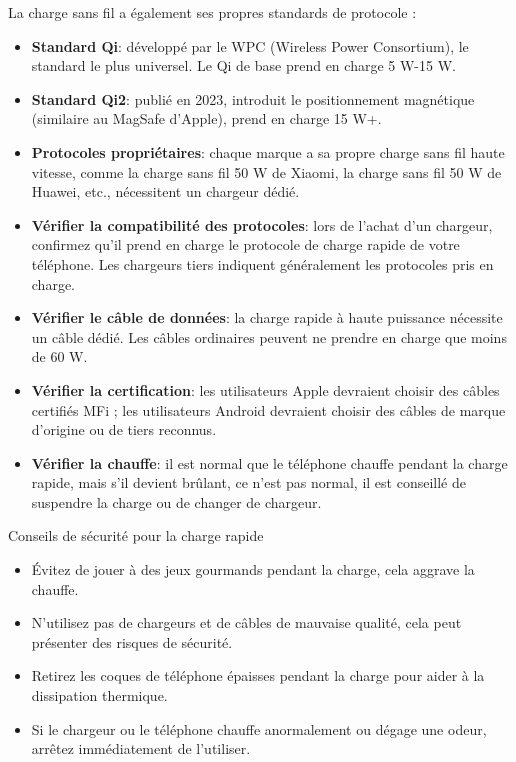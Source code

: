 
La charge sans fil a également ses propres standards de protocole :

\begin{itemize}
  \item \textbf{Standard Qi}: développé par le WPC (Wireless Power Consortium), le standard le plus universel. Le Qi de base prend en charge 5 W-15 W.
  \item \textbf{Standard Qi2}: publié en 2023, introduit le positionnement magnétique (similaire au MagSafe d'Apple), prend en charge 15 W+.
  \item \textbf{Protocoles propriétaires}: chaque marque a sa propre charge sans fil haute vitesse, comme la charge sans fil 50 W de Xiaomi, la charge sans fil 50 W de Huawei, etc., nécessitent un chargeur dédié.
\end{itemize}


\begin{itemize}
  \item \textbf{Vérifier la compatibilité des protocoles}: lors de l'achat d'un chargeur, confirmez qu'il prend en charge le protocole de charge rapide de votre téléphone. Les chargeurs tiers indiquent généralement les protocoles pris en charge.
  \item \textbf{Vérifier le câble de données}: la charge rapide à haute puissance nécessite un câble dédié. Les câbles ordinaires peuvent ne prendre en charge que moins de 60 W.
  \item \textbf{Vérifier la certification}: les utilisateurs Apple devraient choisir des câbles certifiés MFi ; les utilisateurs Android devraient choisir des câbles de marque d'origine ou de tiers reconnus.
  \item \textbf{Vérifier la chauffe}: il est normal que le téléphone chauffe pendant la charge rapide, mais s'il devient brûlant, ce n'est pas normal, il est conseillé de suspendre la charge ou de changer de chargeur.
\end{itemize}

\begin{tcbwarn}{Conseils de sécurité pour la charge rapide}
\begin{itemize}
  \item Évitez de jouer à des jeux gourmands pendant la charge, cela aggrave la chauffe.
  \item N'utilisez pas de chargeurs et de câbles de mauvaise qualité, cela peut présenter des risques de sécurité.
  \item Retirez les coques de téléphone épaisses pendant la charge pour aider à la dissipation thermique.
  \item Si le chargeur ou le téléphone chauffe anormalement ou dégage une odeur, arrêtez immédiatement de l'utiliser.
\end{itemize}

\end{tcbwarn}


